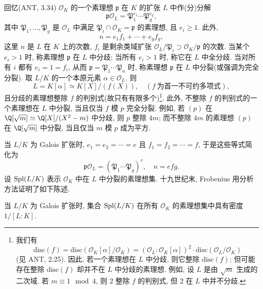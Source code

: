 回忆(ANT, 3.34) $\mathcal{O}_{K}$ 的一个素理想 $\mathfrak{p}$ 在 $K$ 的扩张 $L$ 中作(分)分解
\begin{equation*}
\mathfrak{p}\mathcal{O}_{L} = \mathfrak{P}_{1}^{e_{1}} \cdots \mathfrak{P}_{g}^{e_{g}},
\tag{2}
\end{equation*}
其中 $\mathfrak{P}_{1}, \ldots, \mathfrak{P}_{g}$ 是 $\mathcal{O}_{L}$ 中满足 $\mathfrak{P}_{i} \cap \mathcal{O}_{K} = \mathfrak{p}$ 的素理想, 且 $e_{i} \geq 1$. 此外,
\begin{equation*}
n = e_{1}f_{1} + \cdots + e_{g}f_{g},
\tag{3}
\end{equation*}
这里 $n$ 是 $L$ 在 $K$ 上的次数, $f_{i}$ 是剩余类域扩张 $\mathcal{O}_{L}/\mathfrak{P}_{i} \supset \mathcal{O}_{K}/\mathfrak{p}$ 的次数. 当某个 $e_{i} > 1$ 时, 称素理想 $\mathfrak{p}$ 在 $L$ 中分歧; 当所有 $e_{i} > 1$ 时, 称它在 $L$ 中全分歧. 当对所有 $i$ 都有 $e_{i} = 1 = f_{i}$, 从而 $\mathfrak{p} = \mathfrak{P}_{1} \cdots \mathfrak{P}_{n}$ 时, 称素理想 $\mathfrak{p}$ 在 $L$ 中分裂(或强调为完全分裂). 取 $L/K$ 的一个本原元素 $\alpha \in \mathcal{O}_{L}$. 则
\[
L = K[\alpha] \simeq K[X]/(f(X)), \quad (f\ \text{为首一不可约多项式}),
\]
且分歧的素理想整除 $f$ 的判别式(故只有有限多个)\footnote{我们有
\[
\mathrm{disc}(f)=\mathrm{disc}(\mathcal{O}_{K}[\alpha]/\mathcal{O}_{K})
=(\mathcal{O}_{L}:\mathcal{O}_{K}[\alpha])^{2}\cdot\mathrm{disc}(\mathcal{O}_{L}/\mathcal{O}_{K})
\]
(见 ANT, 2.25). 因此, 若一个素理想在 $L$ 中分歧, 则它整除 $\mathrm{disc}(f)$; 但可能存在整除 $\mathrm{disc}(f)$ 却并不在 $L$ 中分歧的素理想. 例如, 设 $L$ 是由 $\sqrt{m}$ 生成的二次域. 若 $m\equiv1\mod 4$, 则 $2$ 整除 $f$ 的判别式, 但 $2$ 在 $L$ 中并不分歧. }. 此外, 不整除 $f$ 的判别式的一个素理想在 $L$ 中分裂, 当且仅当 $f$ 模 $p$ 完全分裂. 例如, 若 $(p)$ 在 $\Q[\sqrt{m}] \simeq \Q[X]/(X^{2} - m)$ 中分歧, 则 $p$ 整除 $4m$; 而不整除 $4m$ 的素理想 $(p)$ 在 $\Q[\sqrt{m}]$ 中分裂, 当且仅当 $m$ 模 $p$ 成为平方.

当 $L/K$ 为 Galois 扩张时, $e_{1} = e_{2} = \cdots = e$ 且 $f_{1} = f_{2} = \cdots = f$, 于是这些等式简化为
\begin{equation*}
\mathfrak{p}\mathcal{O}_{L} = (\mathfrak{P}_{1} \cdots \mathfrak{P}_{g})^{e}, \quad n = efg.
\tag{4}
\end{equation*}
设 $\operatorname{Spl}(L/K)$ 表示 $\mathcal{O}_{K}$ 中在 $L$ 中分裂的素理想集. 十九世纪末, Frobenius 用分析方法证明了如下陈述.

\begin{theorem}[FROBENIUS]\label{thm:0.1}
当 $L/K$ 为 Galois 扩张时, 集合 $\operatorname{Spl}(L/K)$ 在所有 $\mathcal{O}_{K}$ 的素理想集中具有密度 $1/[L:K]$.
\end{theorem}

